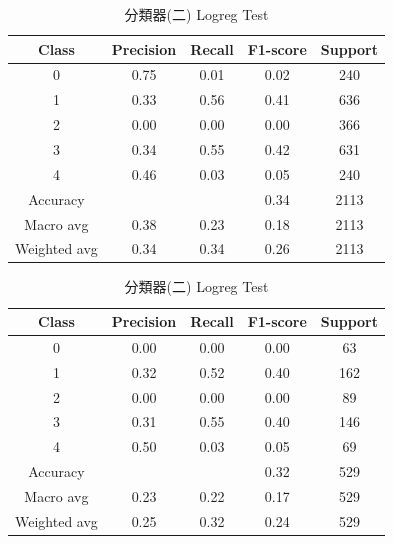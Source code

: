 \begin{enumerate}
\begin{enumerate}
            \begin{table}[H]
            \centering
            \scriptsize
            \begin{minipage}{0.48\textwidth}
            \centering
            \begin{tabular}{c|cccc}
            \hline
            Class & Precision & Recall & F1-score & Support \\
            \hline
            0 & 0.75 & 0.01 & 0.02 & 240 \\
            1 & 0.33 & 0.56 & 0.41 & 636 \\
            2 & 0.00 & 0.00 & 0.00 & 366 \\
            3 & 0.34 & 0.55 & 0.42 & 631 \\
            4 & 0.46 & 0.03 & 0.05 & 240 \\
            \hline
            Accuracy &       &      & 0.34 & 2113 \\
            Macro avg & 0.38 & 0.23 & 0.18 & 2113 \\
            Weighted avg & 0.34 & 0.34 & 0.26 & 2113 \\
            \hline
            \end{tabular}
            \caption{分類器(二) Logreg Train}
            \label{tab:classifier_2_report_train_logreg_logreg_filtered}
            \end{minipage}%
            \hfill
            \begin{minipage}{0.48\textwidth}
            \centering
            \begin{tabular}{c|cccc}
            \hline
            Class & Precision & Recall & F1-score & Support \\
            \hline
            0 & 0.00 & 0.00 & 0.00 & 63 \\
            1 & 0.32 & 0.52 & 0.40 & 162 \\
            2 & 0.00 & 0.00 & 0.00 & 89 \\
            3 & 0.31 & 0.55 & 0.40 & 146 \\
            4 & 0.50 & 0.03 & 0.05 & 69 \\
            \hline
            Accuracy &       &      & 0.32 & 529 \\
            Macro avg & 0.23 & 0.22 & 0.17 & 529 \\
            Weighted avg & 0.25 & 0.32 & 0.24 & 529 \\
            \hline
            \end{tabular}
            \caption{分類器(二) Logreg Test}
            \label{tab:classifier_2_report_test_logreg_logreg_filtered}
            \end{minipage}
            \end{table}



\end{enumerate}
\end{enumerate}
